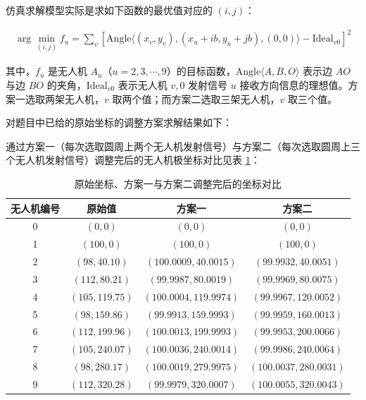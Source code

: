 \documentclass[withoutpreface,bwprint]{cumcmthesis} %
\begin{document}
仿真求解模型实际是求如下函数的最优值对应的 \( (i,j) \)：

\begin{align}
  \arg\min_{(i,j)} f_u = \sum_v \left[ \text{Angle}\langle (x_v, y_v), (x_u + ib, y_u + jb), (0,0) \rangle - \text{Ideal}_{v0} \right]^2  
\end{align}


其中，\( f_u \) 是无人机 \( A_u \)（\( u = 2,3,\cdots,9 \)）的目标函数，\( \text{Angle}\langle A, B, O \rangle \) 表示边 \( AO \) 与边 \( BO \) 的夹角，\( \text{Ideal}_{v0} \) 表示无人机 \( v,0 \) 发射信号 \( u \) 接收方向信息的理想值。方案一选取两架无人机，\( v \) 取两个值；而方案二选取三架无人机，\( v \) 取三个值。

对题目中已给的原始坐标的调整方案求解结果如下：

通过方案一（每次选取圆周上两个无人机发射信号）与方案二（每次选取圆周上三个无人机发射信号）调整完后的无人机极坐标对比见表 \ref{tab:original_compare}：

\begin{table}[H]
  \centering
  \caption{原始坐标、方案一与方案二调整完后的坐标对比}
  \label{tab:original_compare}
  \begin{tabular}{cccc}
    \toprule
    无人机编号 & 原始值 & 方案一 & 方案二 \\
    \midrule
    0 & $(0, 0)$ & $(0, 0)$ & $(0, 0)$ \\
    1 & $(100, 0)$ & $(100, 0)$ & $(100, 0)$ \\
    2 & $(98, 40.10)$ & $(100.0009, 40.0015)$ & $(99.9932, 40.0051)$ \\
    3 & $(112, 80.21)$ & $(99.9987, 80.0019)$ & $(99.9969, 80.0075)$ \\
    4 & $(105, 119.75)$ & $(100.0004, 119.9974)$ & $(99.9967, 120.0052)$ \\
    5 & $(98, 159.86)$ & $(99.9913, 159.9993)$ & $(99.9959, 160.0013)$ \\
    6 & $(112, 199.96)$ & $(100.0013, 199.9993)$ & $(99.9953, 200.0066)$ \\
    7 & $(105, 240.07)$ & $(100.0036, 240.0014)$ & $(99.9986, 240.0064)$ \\
    8 & $(98, 280.17)$ & $(100.0019, 279.9975)$ & $(100.0037, 280.0031)$ \\
    9 & $(112, 320.28)$ & $(99.9979, 320.0007)$ & $(100.0055, 320.0043)$ \\
    \bottomrule
  \end{tabular}
\end{table}
\end{document}
